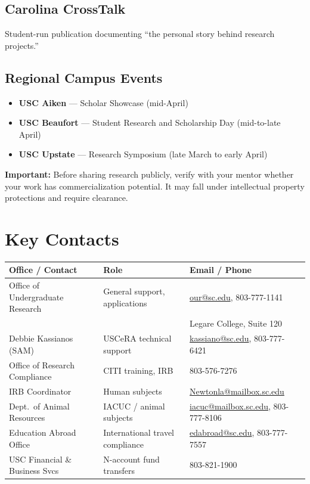 \documentclass[11pt, letterpaper]{article}
\newcommand{\warnbox}[1]{%
\begin{tcolorbox}[colback=Black10, colframe=Rose]
\textbf{Important:} #1
\end{tcolorbox}
}
\begin{document}
\subsection{Carolina CrossTalk}

Student-run publication documenting ``the personal story behind research projects.''

\subsection{Regional Campus Events}

\begin{itemize}[nosep]
    \item \textbf{USC Aiken} --- Scholar Showcase (mid-April)
    \item \textbf{USC Beaufort} --- Student Research and Scholarship Day (mid-to-late April)
    \item \textbf{USC Upstate} --- Research Symposium (late March to early April)
\end{itemize}

\warnbox{Before sharing research publicly, verify with your mentor whether your work has commercialization potential. It may fall under intellectual property protections and require clearance.}

\section{Key Contacts}

\begin{center}
\begin{tabularx}{\textwidth}{@{}l X l@{}}
\toprule
\textbf{Office / Contact} & \textbf{Role} & \textbf{Email / Phone} \\
\midrule
Office of Undergraduate Research & General support, applications & \href{mailto:our@sc.edu}{our@sc.edu}, 803-777-1141 \\
 & & Legare College, Suite 120 \\
Debbie Kassianos (SAM) & USCeRA technical support & \href{mailto:kassiano@sc.edu}{kassiano@sc.edu}, 803-777-6421 \\
Office of Research Compliance & CITI training, IRB & 803-576-7276 \\
IRB Coordinator & Human subjects & \href{mailto:Newtonla@mailbox.sc.edu}{Newtonla@mailbox.sc.edu} \\
Dept.\ of Animal Resources & IACUC / animal subjects & \href{mailto:iacuc@mailbox.sc.edu}{iacuc@mailbox.sc.edu}, 803-777-8106 \\
Education Abroad Office & International travel compliance & \href{mailto:edabroad@sc.edu}{edabroad@sc.edu}, 803-777-7557 \\
USC Financial \& Business Svcs & N-account fund transfers & 803-821-1900 \\
\bottomrule
\end{tabularx}
\end{center}
\end{document}
